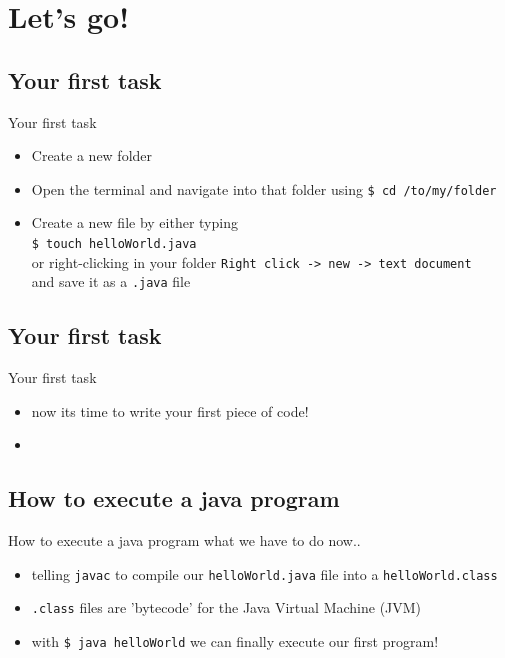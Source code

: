 
\section{Let's go!}

\subsection{Your first task}
\begin{frame}[fragile]{Your first task}
	\begin{itemize}[<+->]
		\item Create a new folder
		\item Open the terminal and navigate into that folder using \lstinline[columns=fixed]{$ cd /to/my/folder}
		\item Create a new file by either typing\\ \lstinline[columns=fixed]{$ touch helloWorld.java}\\
		      or right-clicking in your folder \lstinline[columns=fixed]{Right click -> new -> text document}\\
		      and save it as a \lstinline[columns=fixed]{.java} file
	\end{itemize}
\end{frame}

\subsection{Your first task}
\begin{frame}[fragile]{Your first task}
	\begin{itemize}[<+->]
		\item now its time to write your first piece of code!
		\item[] 
	\end{itemize}
\end{frame}

\subsection{How to execute a java program}
\begin{frame}[fragile]{How to execute a java program}
	what we have to do now..
	\begin{itemize}[<+->]
		\item telling \lstinline[columns=fixed]{javac} to compile our \lstinline[columns=fixed]{helloWorld.java} file into a \lstinline[columns=fixed]{helloWorld.class}
		\item \lstinline[columns=fixed]{.class} files are 'bytecode' for the Java Virtual Machine (JVM)
		\item with \lstinline[columns=fixed]{$ java helloWorld} we can finally execute our first program!
	\end{itemize}
\end{frame}


